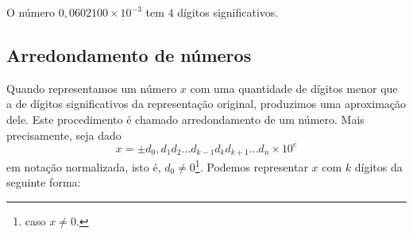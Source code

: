 \begin{ex} O número $0,0602100\times 10^{-3}$ tem $4$ dígitos significativos.
\end{ex}

\subsection{Arredondamento de números}

Quando representamos um número $x$ com uma quantidade de dígitos menor que a de dígitos significativos da representação original, produzimos uma aproximação dele. Este procedimento é chamado arredondamento de um número. Mais precisamente, seja dado
\begin{equation}
  x = \pm d_0,d_1d_2\ldots d_{k-1}d_kd_{k+1}\ldots d_n \times 10^e
\end{equation}
em notação normalizada, isto é, $d_0\neq 0$\footnote{caso $x\neq 0$.}. Podemos representar $x$ com $k$ dígitos da seguinte forma:
